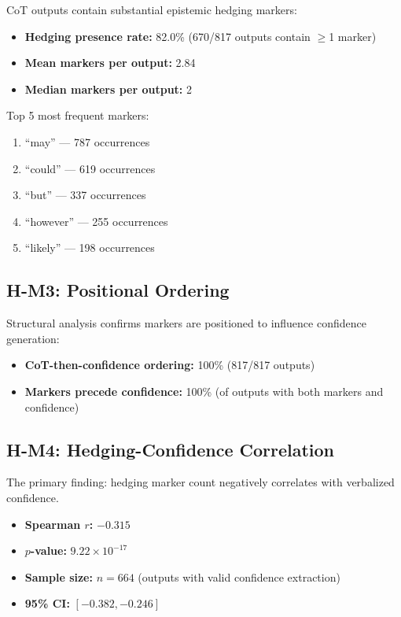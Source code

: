 CoT outputs contain substantial epistemic hedging markers:

\begin{itemize}
    \item \textbf{Hedging presence rate:} 82.0\% (670/817 outputs contain $\geq$1 marker)
    \item \textbf{Mean markers per output:} 2.84
    \item \textbf{Median markers per output:} 2
\end{itemize}

Top 5 most frequent markers:
\begin{enumerate}
    \item ``may'' --- 787 occurrences
    \item ``could'' --- 619 occurrences
    \item ``but'' --- 337 occurrences
    \item ``however'' --- 255 occurrences
    \item ``likely'' --- 198 occurrences
\end{enumerate}

\subsection{H-M3: Positional Ordering}

Structural analysis confirms markers are positioned to influence confidence generation:

\begin{itemize}
    \item \textbf{CoT-then-confidence ordering:} 100\% (817/817 outputs)
    \item \textbf{Markers precede confidence:} 100\% (of outputs with both markers and confidence)
\end{itemize}

\subsection{H-M4: Hedging-Confidence Correlation}

The primary finding: hedging marker count negatively correlates with verbalized confidence.

\begin{itemize}
    \item \textbf{Spearman $r$:} $-0.315$
    \item \textbf{$p$-value:} $9.22 \times 10^{-17}$
    \item \textbf{Sample size:} $n=664$ (outputs with valid confidence extraction)
    \item \textbf{95\% CI:} $[-0.382, -0.246]$
\end{itemize}

